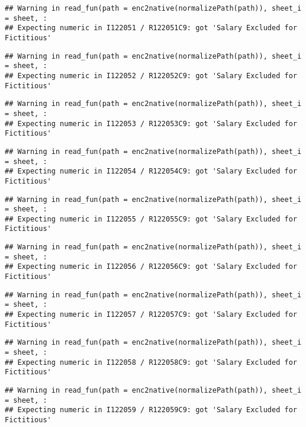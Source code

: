 \documentclass[
]{article}
\begin{document}
\begin{verbatim}
## Warning in read_fun(path = enc2native(normalizePath(path)), sheet_i = sheet, :
## Expecting numeric in I122051 / R122051C9: got 'Salary Excluded for Fictitious'
\end{verbatim}

\begin{verbatim}
## Warning in read_fun(path = enc2native(normalizePath(path)), sheet_i = sheet, :
## Expecting numeric in I122052 / R122052C9: got 'Salary Excluded for Fictitious'
\end{verbatim}

\begin{verbatim}
## Warning in read_fun(path = enc2native(normalizePath(path)), sheet_i = sheet, :
## Expecting numeric in I122053 / R122053C9: got 'Salary Excluded for Fictitious'
\end{verbatim}

\begin{verbatim}
## Warning in read_fun(path = enc2native(normalizePath(path)), sheet_i = sheet, :
## Expecting numeric in I122054 / R122054C9: got 'Salary Excluded for Fictitious'
\end{verbatim}

\begin{verbatim}
## Warning in read_fun(path = enc2native(normalizePath(path)), sheet_i = sheet, :
## Expecting numeric in I122055 / R122055C9: got 'Salary Excluded for Fictitious'
\end{verbatim}

\begin{verbatim}
## Warning in read_fun(path = enc2native(normalizePath(path)), sheet_i = sheet, :
## Expecting numeric in I122056 / R122056C9: got 'Salary Excluded for Fictitious'
\end{verbatim}

\begin{verbatim}
## Warning in read_fun(path = enc2native(normalizePath(path)), sheet_i = sheet, :
## Expecting numeric in I122057 / R122057C9: got 'Salary Excluded for Fictitious'
\end{verbatim}

\begin{verbatim}
## Warning in read_fun(path = enc2native(normalizePath(path)), sheet_i = sheet, :
## Expecting numeric in I122058 / R122058C9: got 'Salary Excluded for Fictitious'
\end{verbatim}

\begin{verbatim}
## Warning in read_fun(path = enc2native(normalizePath(path)), sheet_i = sheet, :
## Expecting numeric in I122059 / R122059C9: got 'Salary Excluded for Fictitious'
\end{verbatim}
\end{document}
